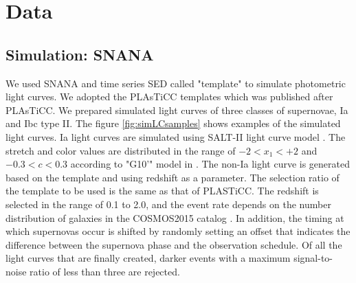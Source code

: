 \documentclass[useamsfonts]{pasj01}
\begin{document}
\section{Data}
\subsection{Simulation: SNANA}
We used SNANA \citep{Kessler_2009} and time series SED called "template" to simulate photometric light curves.
We adopted the PLAsTiCC templates \citep{plasticc_models} which was published after PLAsTiCC. 
We prepared simulated light curves of three classes of supernovae, Ia and Ibc type II.
The figure \ref{fig:simLCsamples} shows examples of the simulated light curves.
%
%
%
Ia light curves are simulated using SALT-II light curve model \citep{Guy_2010}.
The stretch and color values are distributed in the range of $-2<x_1<+2$ and $-0.3<c<0.3$ according to "G10'" model in \citet{Mosher_2014}.
The non-Ia light curve is generated based on the template and using redshift as a parameter.
The selection ratio of the template to be used is the same as that of PLASTiCC.
The redshift is selected in the range of 0.1 to 2.0, and the event rate depends on the number distribution of galaxies in the COSMOS2015 catalog \citep{2016ApJS..224...24L}.
In addition, the timing at which supernovas occur is shifted by randomly setting an offset that indicates the difference between the supernova phase and the observation schedule.
Of all the light curves that are finally created, darker events with a maximum signal-to-noise ratio of less than three are rejected.
%
\end{document}
